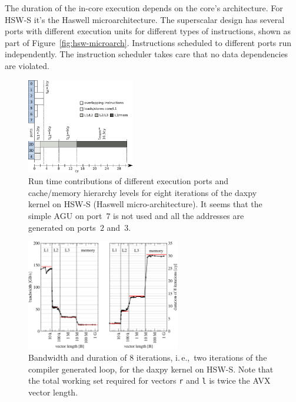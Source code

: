 
The duration of the in-core execution depends on the core's architecture.
For HSW-S it's the Haswell microarchitecture.
The superscalar design has several ports with different execution units for
different types of instructions, shown as part of Figure~\ref{fig:hsw-microarch}.
Instructions scheduled to different ports run independently.
The instruction scheduler takes care that no data dependencies are violated.

\begin{figure}[t]
  \centering
  \includegraphics[width=0.42\textwidth,clip=true]{images/ecm-hsw-daxpy}
  \caption{Run time contributions of different execution ports and cache/memory
hierarchy levels for eight iterations of the daxpy kernel on HSW-S (Haswell micro-architecture). It seems that the simple AGU on port~$7$ is not used and all the addresses are generated on ports~$2$ and~$3$.}
  \label{fig:daxpy:ecm}
\end{figure}

\begin{figure}[t]
  \centering
  \includegraphics[width=0.60\textwidth,clip=true]{images/daxpy-bw-hasep1-f-2_3-w-cy}
  \caption{Bandwidth and duration of 8 iterations, i.\,e.,\ two iterations of the
compiler generated loop, for the daxpy kernel on HSW-S. Note that the total
working set required for vectors
\protect\texttt{r} and \texttt{l} is twice the AVX vector length.}
  \label{fig:daxpy:perf}
\end{figure}

